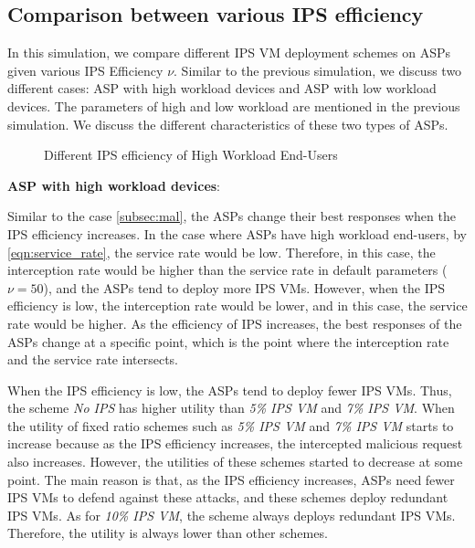 \documentclass[10pt,journal, compsoc]{IEEEtran}
\begin{document}
\subsection{Comparison between various IPS efficiency}
In this simulation, we compare different IPS VM deployment schemes on ASPs given various IPS Efficiency $\nu$. Similar to the previous simulation, we discuss two different cases: ASP with high workload devices and ASP with low workload devices. The parameters of high and low workload are mentioned in the previous simulation. We discuss the different characteristics of these two types of ASPs.

\begin{figure}[!]
\captionsetup{justification=centering}
  \hfill
  \hfill
\label{fig:eff_high}
\caption{Different IPS efficiency of High Workload End-Users}
\end{figure}
\textbf{ASP with high workload devices}:

Similar to the case \cref{subsec:mal}, the ASPs change their best responses when the IPS efficiency increases. In the case where ASPs have high workload end-users, by \cref{eqn:service_rate}, the service rate would be low. Therefore, in this case, the interception rate would be higher than the service rate in default parameters ($\nu = 50$), and the ASPs tend to deploy more IPS VMs. However, when the IPS efficiency is low, the interception rate would be lower, and in this case, the service rate would be higher. As the efficiency of IPS increases, the best responses of the ASPs change at a specific point, which is the point where the interception rate and the service rate intersects.


When the IPS efficiency is low, the ASPs tend to deploy fewer IPS VMs. Thus, the scheme \textit{No IPS} has higher utility than \textit{5\% IPS VM} and \textit{7\% IPS VM}. When the utility of fixed ratio schemes such as \textit{5\% IPS VM} and \textit{7\% IPS VM} starts to increase because as the IPS efficiency increases, the intercepted malicious request also increases. However, the utilities of these schemes started to decrease at some point. The main reason is that, as the IPS efficiency increases, ASPs need fewer IPS VMs to defend against these attacks, and these schemes deploy redundant IPS VMs. As for \textit{10\% IPS VM}, the scheme always deploys redundant IPS VMs. Therefore, the utility is always lower than other schemes.
\end{document}
